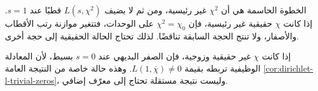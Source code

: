 \begin{remark}
الخطوة الحاسمة هي أن \(\chi^2\) غير رئيسية، ومن ثم لا يضيف
\(L(s,\chi^2)\) قطبًا عند \(s=1\). إذا كانت \(\chi\) حقيقية غير
رئيسية، فإن \(\chi^2=\chi_0\) على الوحدات، فتتغير موازنة رتب الأقطاب
والأصفار، ولا تنتج الحجة السابقة تناقضًا. لذلك تحتاج الحالة الحقيقية إلى
حجة أخرى.
\end{remark}

\begin{remark}
إذا كانت \(\chi\) غير حقيقية وزوجية، فإن الصفر البديهي عند \(s=0\)
بسيط، لأن المعادلة الوظيفية تربطه بقيمة
\(L(1,\overline\chi)\ne0\). وهذه حالة خاصة من النتيجة العامة
\ref{cor:dirichlet-l-trivial-zeros}، وليست نتيجة مستقلة تحتاج إلى معرّف
إضافي.
\end{remark}

